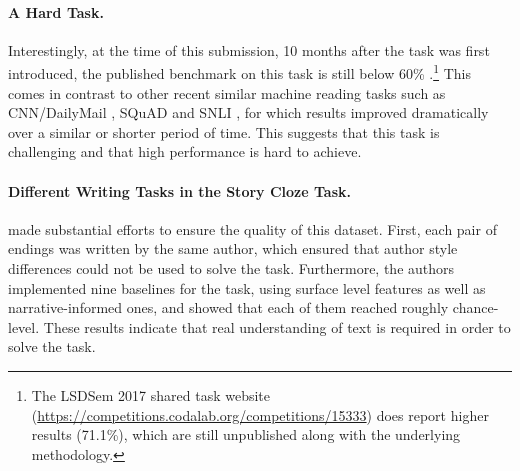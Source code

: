 \documentclass[11pt,a4paper]{article}
\newcommand{\resolved}[1]{}
\newcommand{\roy}[1]{{\color{orange}\textsc{[#1 --rs]}}}
\newcommand{\yc}[1]{{\color{bblue}\{\textit{#1}\}$_{yc}$}}
\newcommand{\nascomment}[1]{{\color{blue}\textsc{[#1 --nas]}}}
\renewcommand{\roy}[1]{}
\begin{document}
\paragraph{A Hard Task.}\roy{Was ``State-of-the-art results". Luke mentioned that this puts the focus on our results rather than on the nature of the task, as we intended}
Interestingly, at the time of this submission, 10 months after the
task was first introduced, the published benchmark on this task is
still below 60\% \cite{Salle:2016}.\footnote{The LSDSem 2017 shared
  task website (\url{https://competitions.codalab.org/competitions/15333}) does report higher results (71.1\%), which are still
  unpublished along with the underlying methodology.}
This comes in contrast to other recent similar machine reading tasks such as CNN/DailyMail \cite{hermann2015teaching}, SQuAD \cite{rajpurkar2016squad} and SNLI \cite{bowman2015large}, for which results improved dramatically over a similar or shorter period of time.
This suggests that this task is challenging and that high performance is hard to achieve.
 \resolved{\yc{SQuAD was officially published in Nov 2016. by the time the official EMNLP talk was presented, the leaderboard performance (still unpublished) was  30\% beyond the best results in the paper. Given that, the statement of this paragraph seems a bit of overkill...?} \nascomment{it sounds like Yejin is saying that on squad, there was an even faster acceleration?  or that we should change ``similar period of time'' to ``similar or shorter period of time''?}}

\paragraph{Different Writing Tasks in the Story Cloze Task.}
\citet{Mostafazadeh:2016} made substantial efforts to ensure the quality of this dataset. 
First, each pair of endings was written by the same author, which ensured that author style differences could not be used to solve the task. 
Furthermore, the authors implemented nine baselines for the task, using surface level features as well as narrative-informed ones, and showed that each of them reached roughly chance-level.
These results indicate that real understanding of text is required in order to solve the task.
\end{document}
